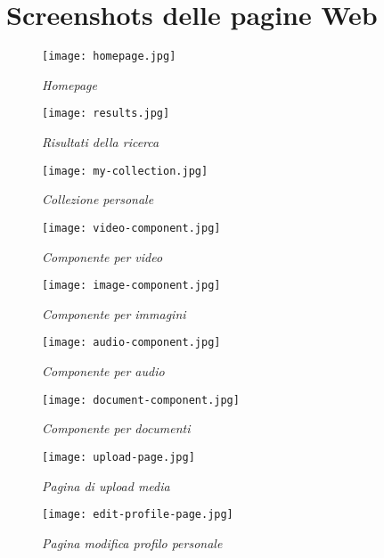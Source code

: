 \chapter{Screenshots delle pagine Web}

\begin{figure}[h]
\centering
\texttt{[image: homepage.jpg]}
\caption{\textit{Homepage}}\label{homepage}
\end{figure}

\begin{figure}[h]
\centering
\texttt{[image: results.jpg]}
\caption{\textit{Risultati della ricerca}}\label{results}
\end{figure}

\begin{figure}[h]
\centering
\texttt{[image: my-collection.jpg]}
\caption{\textit{Collezione personale}}\label{my-collection}
\end{figure}

\begin{figure}[h]
\centering
\texttt{[image: video-component.jpg]}
\caption{\textit{Componente per video}}\label{video-component}
\end{figure}

\begin{figure}[h]
\centering
\texttt{[image: image-component.jpg]}
\caption{\textit{Componente per immagini}}\label{image-component}
\end{figure}

\begin{figure}[h]
\centering
\texttt{[image: audio-component.jpg]}
\caption{\textit{Componente per audio}}\label{audio-component}
\end{figure}

\begin{figure}[h]
\centering
\texttt{[image: document-component.jpg]}
\caption{\textit{Componente per documenti}}\label{document-component}
\end{figure}

\begin{figure}[h]
\centering
\texttt{[image: upload-page.jpg]}
\caption{\textit{Pagina di upload media}}\label{upload-page}
\end{figure}

\begin{figure}[h]
\centering
\texttt{[image: edit-profile-page.jpg]}
\caption{\textit{Pagina modifica profilo personale}}\label{edit-profile-page}
\end{figure}